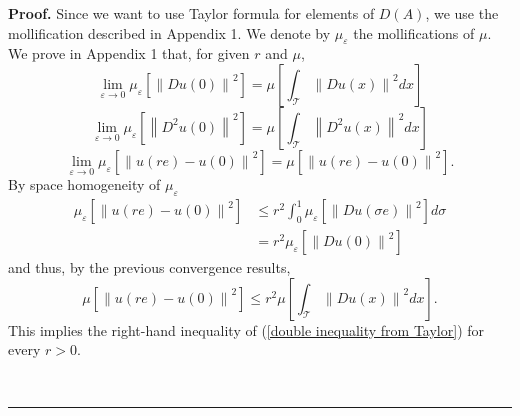 \documentclass[11pt]{preprint}
\newenvironment{proof}[1][Proof]{\textbf{#1.} }{\ \rule{0.5em}{0.5em}}
\begin{document}
\begin{proof}
Since we want to use Taylor formula for elements of $D(A)$, we use the
mollification described in Appendix 1. We denote by $\mu_{\varepsilon}$ the
mollifications of $\mu$. We prove in Appendix 1 that, for given $r$ and $\mu
$,
\[
\lim_{\varepsilon\rightarrow0}\mu_{\varepsilon}\left[  \left\|  Du\left(
0\right)  \right\|  ^{2}\right]  =\mu\left[  \int_{\mathcal{T}}\left\|
Du\left(  x\right)  \right\|  ^{2}dx\right]
\]%
\[
\lim_{\varepsilon\rightarrow0}\mu_{\varepsilon}\left[  \left\|  D^{2}u\left(
0\right)  \right\|  ^{2}\right]  =\mu\left[  \int_{\mathcal{T}}\left\|
D^{2}u\left(  x\right)  \right\|  ^{2}dx\right]
\]%
\[
\lim_{\varepsilon\rightarrow0}\mu_{\varepsilon}\left[  \left\|  u\left(
re\right)  -u\left(  0\right)  \right\|  ^{2}\right]  =\mu\left[  \left\|
u\left(  re\right)  -u\left(  0\right)  \right\|  ^{2}\right]  .
\]
By space homogeneity of $\mu_{\varepsilon}$
\begin{align*}
\mu_{\varepsilon}\left[  \left\|  u\left(  re\right)  -u\left(  0\right)
\right\|  ^{2}\right]   &  \leq r^{2}\int_{0}^{1}\mu_{\varepsilon}\left[
\left\|  Du\left(  \sigma e\right)  \right\|  ^{2}\right]  d\sigma\\
&  =r^{2}\mu_{\varepsilon}\left[  \left\|  Du\left(  0\right)  \right\|
^{2}\right]
\end{align*}
and thus, by the previous convergence results,
\[
\mu\left[  \left\|  u\left(  re\right)  -u\left(  0\right)  \right\|
^{2}\right]  \leq r^{2}\mu\left[  \int_{\mathcal{T}}\left\|  Du\left(
x\right)  \right\|  ^{2}dx\right]  .
\]
This implies the right-hand inequality of (\ref{double inequality from
Taylor}) for every $r>0$.


\end{proof}
\end{document}
